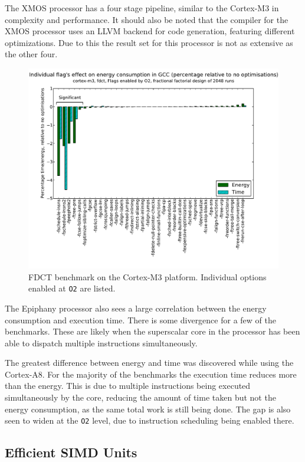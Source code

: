 \documentclass[twocolumn]{article}
\let\oldcaption\caption
\renewcommand{\caption}[1]{\oldcaption{\textup{#1}}}
\begin{document}
The XMOS processor has a four stage pipeline, similar to the Cortex-M3 in complexity and performance. It should also be noted that the compiler for the XMOS processor uses an LLVM backend for code generation, featuring different optimizations. Due to this the result set for this processor is not as extensive as the other four.

\begin{figure}[bt!]
	\includegraphics[width=\linewidth,clip,trim=0.5cm 0 2cm 1.8cm]{cortex-m3/O2_main_effects_fdct.pdf}
	\caption{FDCT benchmark on the Cortex-M3 platform. Individual options enabled at \texttt{O2} are listed.}
	\label{Fig:FdctO2MainEffects}
\end{figure}

The Epiphany processor also sees a large correlation between the energy consumption and execution time. There is some divergence for a few of the benchmarks. These are likely when the superscalar core in the processor has been able to dispatch multiple instructions simultaneously.

The greatest difference between energy and time was discovered while using the Cortex-A8. For the majority of the benchmarks the execution time reduces more than the energy. This is due to multiple instructions being executed simultaneously by the core, reducing the amount of time taken but not the energy consumption, as the same total work is still being done. The gap is also seen to widen at the \texttt{O2} level, due to instruction scheduling being enabled there.

\subsection{Efficient SIMD Units}
\end{document}
